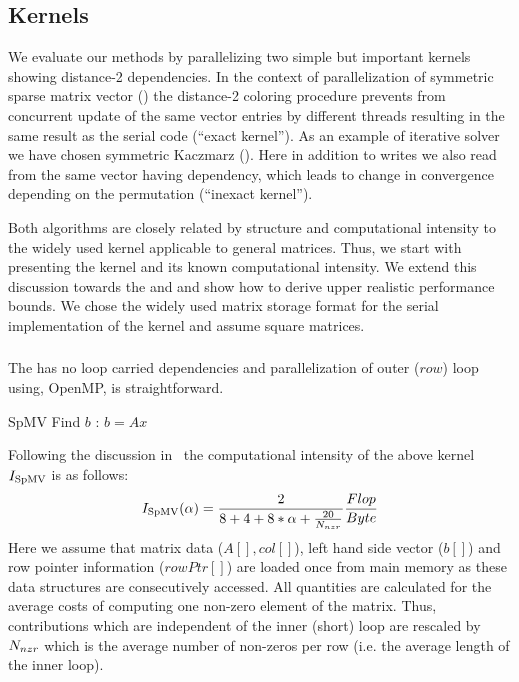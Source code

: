 \subsection{Kernels} \label{subsec:test_kernels}
We evaluate our methods by parallelizing two simple but important kernels showing distance-2 dependencies. In the context of parallelization of symmetric sparse matrix vector (\SymmSpmv) the distance-2 coloring procedure prevents from concurrent update of the same vector entries by different threads resulting in the same result as the serial code (``exact kernel''). As an example of iterative solver we have chosen symmetric Kaczmarz (\SYMMKACZ). Here in addition to writes we also read from the same vector having dependency, which leads to change in convergence depending on the permutation (``inexact kernel'').

Both algorithms are closely related by structure and computational intensity to the widely used \SpMV kernel applicable to general matrices. Thus, we start with presenting the \SpMV kernel and its known computational intensity. We extend this discussion towards the \SymmSpmv and \SYMMKACZ and show how to derive upper realistic performance bounds. We chose the widely used \CRS matrix storage format for the serial implementation of the kernel and assume square matrices.

\subsubsection{\SpMV}
The \SpMV has no loop carried dependencies and parallelization of outer ($row$) loop using, \eg OpenMP, is straightforward. 
\begin{algorithm}[H]
	\caption{SpMV Find $b$ : $b=A x$} 
	\label{alg:SpMV}
	\begin{algorithmic}[1]
		\ENDFOR
		\ENDFOR
	\end{algorithmic}
\end{algorithm}
Following the discussion in~\cite{Moritz_sell} the computational intensity of the above kernel $I_\mathrm{SpMV}$  is as follows:
\begin{equation}
\label{eq:SpMV_intensity}
I_\mathrm{\SpMV} (\alpha)= \frac{2}{8+4+8*\alpha+\frac{20}{\NNZRmath}} \frac{Flop}{Byte} \\
\end{equation}
Here we assume that matrix data  ($A[], col[]$), left hand side vector ($b[]$) and row pointer information ($rowPtr[]$) are loaded once from main memory as these data structures are consecutively accessed. All quantities are calculated for the average costs of computing one non-zero element of the matrix. Thus, contributions which are independent of the inner (short) loop are rescaled by $N_{nzr}$ which is the average number of non-zeros per row (i.e. the average length of the inner loop).

